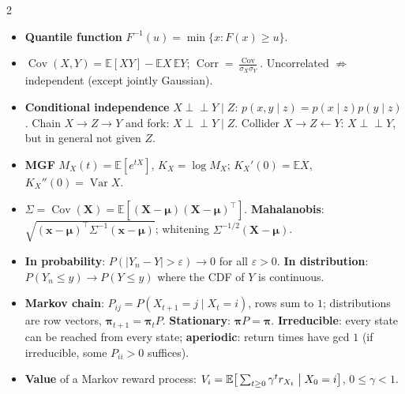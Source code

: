 \documentclass[10pt]{article}
\newcommand{\E}{\mathbb{E}}
\newcommand{\indep}{\perp\!\!\!\perp}
\DeclareMathOperator{\Var}{Var}
\DeclareMathOperator{\Cov}{Cov}
\DeclareMathOperator{\Corr}{Corr}
\newcommand{\topic}[1]{\par\smallskip\noindent{\color{blue!50!black}\textbf{#1}}\par\nopagebreak}
\begin{document}
\begin{multicols}{2}
\topic{Probability}
\begin{itemize}
    \item \textbf{Quantile function} $F^{-1}(u) = \min\{x : F(x) \geq u\}$.
    \item $\Cov(X, Y) = \E[XY] - \E X\,\E Y$; $\Corr = \frac{\Cov}{\sigma_X\sigma_Y}$. Uncorrelated $\not\Rightarrow$ independent (except jointly Gaussian).
    \item \textbf{Conditional independence} $X \indep Y \mid Z$: $p(x, y \mid z) = p(x \mid z)p(y \mid z)$. Chain $X \to Z \to Y$ and fork: $X \indep Y \mid Z$. Collider $X \to Z \leftarrow Y$: $X \indep Y$, but in general not given $Z$.
    \item \textbf{MGF} $M_X(t) = \E[e^{tX}]$, $K_X = \log M_X$; $K_X'(0) = \E X$, $K_X''(0) = \Var X$.
    \item $\Sigma = \Cov(\mathbf{X}) = \E[(\mathbf{X} - \boldsymbol{\mu})(\mathbf{X} - \boldsymbol{\mu})^\top]$. \textbf{Mahalanobis}: $\sqrt{(\mathbf{x} - \boldsymbol{\mu})^\top\Sigma^{-1}(\mathbf{x} - \boldsymbol{\mu})}$; whitening $\Sigma^{-1/2}(\mathbf{X} - \boldsymbol{\mu})$.
    \item \textbf{In probability}: $P(|Y_n - Y| > \varepsilon) \to 0$ for all $\varepsilon > 0$. \textbf{In distribution}: $P(Y_n \leq y) \to P(Y \leq y)$ where the CDF of $Y$ is continuous.
    \item \textbf{Markov chain}: $P_{ij} = P(X_{t+1} = j \mid X_t = i)$, rows sum to $1$; distributions are row vectors, $\boldsymbol\pi_{t+1} = \boldsymbol\pi_tP$. \textbf{Stationary}: $\boldsymbol\pi P = \boldsymbol\pi$. \textbf{Irreducible}: every state can be reached from every state; \textbf{aperiodic}: return times have gcd $1$ (if irreducible, some $P_{ii} > 0$ suffices).
    \item \textbf{Value} of a Markov reward process: $V_i = \E\big[\sum_{t \geq 0}\gamma^tr_{X_t} \bigm| X_0 = i\big]$, $0 \leq \gamma < 1$.
\end{itemize}


\end{multicols}
\end{document}
